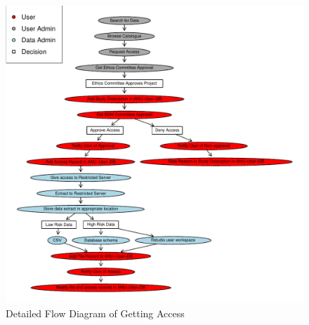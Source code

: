 \documentclass[a4paper]{article}
\begin{document}
\begin{figure}[!h]
\centering
\includegraphics[width=1.4\textwidth]{DataAccessFlowDiagram-GettingAccess.pdf}
\caption{Detailed Flow Diagram of Getting Access}
\label{fig:DataAccessFlowDiagram-GettingAccess}
\end{figure}
\clearpage
\end{document}
